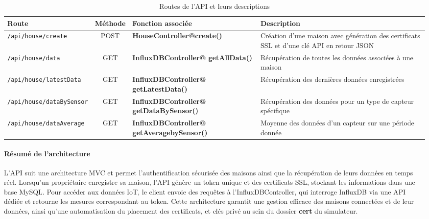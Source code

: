 \documentclass[10pt, a4paper]{report}
\begin{document}
	

\begin{table}[h]
	\centering
	\small %
	\renewcommand{\arraystretch}{1.2} %
	\begin{tabularx}{\textwidth}{|X|c|X|X|}
		\hline
		\textbf{Route} & \textbf{Méthode} & \textbf{Fonction associée} & \textbf{Description} \\
		\hline
		\texttt{/api/house/create} & POST & \textbf{HouseController@create()} & Création d’une maison avec génération des certificats SSL et d’une clé API en retour JSON \\
		\hline
		\texttt{/api/house/data} & GET & \textbf{InfluxDBController@
		getAllData()} & Récupération de toutes les données associées à une maison \\
		\hline
		\texttt{/api/house/latestData} & GET & \textbf{InfluxDBController@
			getLatestData()} & Récupération des dernières données enregistrées \\
		\hline
		\texttt{/api/house/dataBySensor} & GET & \textbf{InfluxDBController@
			getDataBySensor()} & Récupération des données pour un type de capteur spécifique \\
		\hline
		\texttt{/api/house/dataAverage} & GET & \textbf{InfluxDBController@
			getAveragebySensor()} & Moyenne des données d’un capteur sur une période donnée \\
		\hline
	\end{tabularx}
	\caption{Routes de l'API et leurs descriptions}
	\label{tab:api_routes}
\end{table}
	
	\paragraph{Résumé de l'architecture}L'API suit une architecture MVC et permet l’authentification sécurisée des maisons ainsi que la récupération de leurs données en temps réel. Lorsqu’un propriétaire enregistre sa maison, l’API génère un token unique et des certificats SSL, stockant les informations dans une base MySQL. Pour accéder aux données IoT, le client envoie des requêtes à l’InfluxDBController, qui interroge InfluxDB via une API dédiée et retourne les mesures correspondant au token. Cette architecture garantit une gestion efficace des maisons connectées et de leur données, ainsi qu'une automatisation du placement des certificats, et clés privé au sein du dossier \textbf{cert} du simulateur.\\
	
\end{document}
